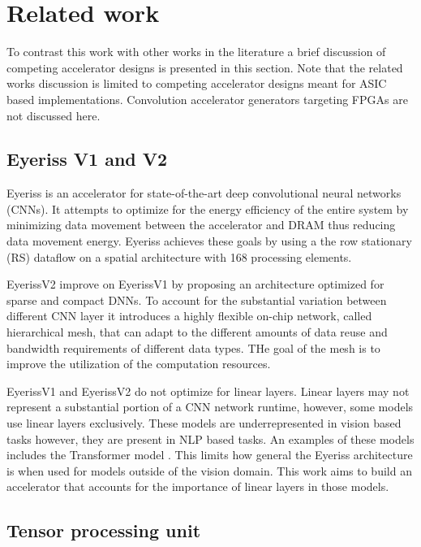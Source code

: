 \section{Related work}
\label{chap:related_work}

To contrast this work with other works in the literature a brief discussion of
competing accelerator designs is presented in this section. Note that the
related works discussion is limited to competing accelerator designs meant for
ASIC based implementations. Convolution accelerator generators targeting FPGAs
are not discussed here.

\subsection{Eyeriss V1 and V2}
\label{chap:related_work:eyeriss}

Eyeriss \cite{isscc_2016_chen_eyeriss} is an accelerator for state-of-the-art
deep convolutional neural networks (CNNs). It attempts to optimize for the
energy efficiency of the entire system by minimizing data movement between the
accelerator and DRAM thus reducing data movement energy. Eyeriss achieves these
goals by using a the row stationary (RS) dataflow on a spatial architecture with
168 processing elements. 

EyerissV2 \cite{eyerissv2} improve on EyerissV1 by proposing an architecture
optimized for sparse and compact DNNs. To account for the substantial variation
between different CNN layer it introduces a highly flexible on-chip network,
called hierarchical mesh, that can adapt to the different amounts of data reuse
and bandwidth requirements of different data types. THe goal of the mesh is to
improve the utilization of the computation resources.

EyerissV1 and EyerissV2 do not optimize for linear layers. Linear layers may not
represent a substantial portion of a CNN network runtime, however, some models
use linear layers exclusively. These models are underrepresented in vision based
tasks however, they are present in NLP based tasks. An examples of these
models includes the Transformer model \cite{transformer_model}. This limits how general the
Eyeriss architecture is when used for models outside of the vision domain. This
work aims to build an accelerator that accounts for the importance of linear
layers in those models. 

\subsection{Tensor processing unit}
\label{chap:related_work:tpu}

